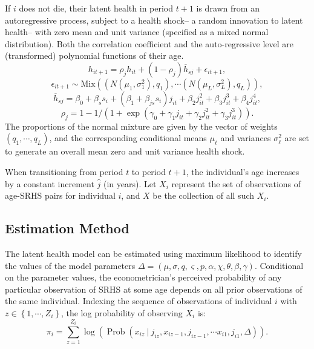 \documentclass[12pt,pdftex,letterpaper]{article}
\newcommand{\Prob}{\operatorname{Prob}}
\newcommand{\Health}{h}
\newcommand{\ExpHealth}{\overline{\Health}}
\newcommand{\Report}{x}
\newcommand{\Age}{j}
\newcommand{\Sex}{s}
\newcommand{\AgeIncr}{\hat{\Age}}
\newcommand{\Corr}{\rho}
\newcommand{\Cut}{\chi}
\newcommand{\MortParam}{\theta}
\newcommand{\CorrParam}{\gamma}
\newcommand{\HealthParam}{\beta}
\newcommand{\LatentParam}{\alpha}
\newcommand{\HealthShock}{\epsilon}
\newcommand{\ShockMean}{\mu}
\newcommand{\ShockStd}{\sigma}
\newcommand{\MixProb}{q}
\newcommand{\TypeProb}{p}
\newcommand{\ReportStd}{\varsigma}
\newcommand{\Data}{X}
\newcommand{\ParamVec}{\Delta}
\newcommand{\LL}{\pi}
\begin{document}
If $i$ does not die, their latent health in period $t+1$ is drawn from an autoregressive process, subject to a health shock-- a random innovation to latent health-- with zero mean and unit variance (specified as a mixed normal distribution). Both the correlation coefficient and the auto-regressive level are (transformed) polynomial functions of their age.
\begin{equation*}
\Health_{it+1} = \Corr_{\Age} \Health_{it} + (1-\Corr_{\Age}) \ExpHealth_{\Sex\Age} + \HealthShock_{it+1},
\end{equation*}
\begin{equation}\label{HealthNext}
\HealthShock_{it+1} \sim \text{Mix}((N(\ShockMean_1,\ShockStd_1^2),\MixProb_1), \cdots (N(\ShockMean_L,\ShockStd_L^2),\MixProb_L)),
\end{equation}
\begin{equation*}
\ExpHealth_{\Sex\Age} = \HealthParam_0 + \HealthParam_\Sex \Sex_i + (\HealthParam_1 + \HealthParam_{\Age\Sex} \Sex_i) \Age_{it} + \HealthParam_2 \Age_{it}^2 + \HealthParam_3 \Age_{it}^3 + \HealthParam_4 \Age_{it}^4,
\end{equation*}
\begin{equation*}
 \Corr_{\Age} = 1 - 1 \big/ (1 + \exp(\CorrParam_0 + \CorrParam_1 \Age_{it} + \CorrParam_2 \Age_{it}^2 + \CorrParam_3 \Age_{it}^3)).
\end{equation*}
The proportions of the normal mixture are given by the vector of weights $(\MixProb_1,\cdots,\MixProb_L)$, and the corresponding conditional means $\ShockMean_\ell$ and variances $\ShockStd_\ell^2$ are set to generate an overall mean zero and unit variance health shock.

When transitioning from period $t$ to period $t+1$, the individual's age increases by a constant increment $\AgeIncr$ (in years). Let $\Data_i$ represent the set of observations of age-SRHS pairs for individual $i$, and $\Data$ be the collection of all such $\Data_i$.


\subsection{Estimation Method}\label{sec:Estimation}

The latent health model can be estimated using maximum likelihood to identify the values of the model parameters $\ParamVec = (\ShockMean,\ShockStd,\MixProb,\ReportStd,\TypeProb,\LatentParam,\Cut,\MortParam,\HealthParam,\CorrParam)$. Conditional on the parameter values, the econometrician's perceived probability of any particular observation of SRHS at some age depends on all prior observations of the same individual. Indexing the sequence of observations of individual $i$ with $z \in \left\{1,\cdots,Z_i\right\}$, the log probability of observing $\Data_i$ is:
\begin{equation}
\LL_i = \sum_{z=1}^{Z_i} \log \left( \Prob \left(\Report_{iz} ~\big|~ \Age_{iz}, \Report_{iz-1}, \Age_{iz-1},\cdots \Report_{i1},\Age_{i1}, \Delta \right) \right) .
\end{equation}
\end{document}

